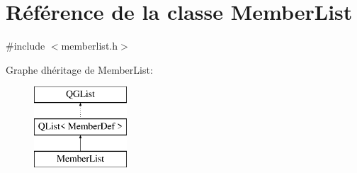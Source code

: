 \hypertarget{class_member_list}{}\section{Référence de la classe Member\+List}
\label{class_member_list}


{\ttfamily \#include $<$memberlist.\+h$>$}

Graphe d\textquotesingle{}héritage de Member\+List\+:\begin{figure}[H]
\begin{center}
\leavevmode
\includegraphics[height=3.000000cm]{class_member_list}
\end{center}
\end{figure}
